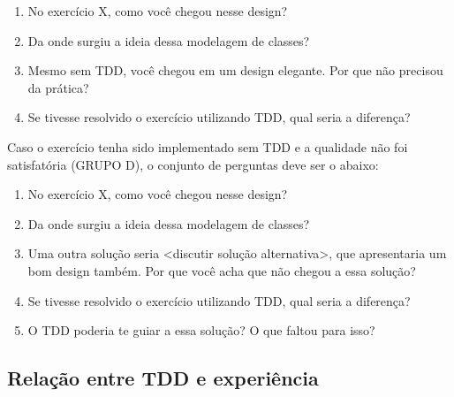 \begin{enumerate}
	
	\item No exercício X, como você chegou nesse design?
	
	\item Da onde surgiu a ideia dessa modelagem de classes?
	
	\item Mesmo sem TDD, você chegou em um design elegante. Por que não precisou da prática?
	
	\item Se tivesse resolvido o exercício utilizando TDD, qual seria a diferença?
	
\end{enumerate}

Caso o exercício tenha sido implementado sem TDD e a qualidade não foi satisfatória (GRUPO D),
o conjunto de perguntas deve ser o abaixo:

\begin{enumerate}
	
	\item No exercício X, como você chegou nesse design?
	
	\item Da onde surgiu a ideia dessa modelagem de classes?
	
	\item Uma outra solução seria <discutir solução alternativa>, que apresentaria um bom design também. Por que você
	acha que não chegou a essa solução?
	
	\item Se tivesse resolvido o exercício utilizando TDD, qual seria a diferença?
	
	\item O TDD poderia te guiar a essa solução? O que faltou para isso?
	
\end{enumerate}

\subsection{Relação entre TDD e experiência}


